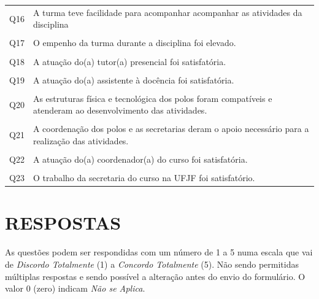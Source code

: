 \documentclass[a4paper,10pt]{article}
\begin{document}
{\begin{center}
\begin{tabularx}{\linewidth}{c|X}
Q16&A turma teve facilidade para acompanhar acompanhar as atividades da disciplina\\\\
Q17&O empenho da turma durante a disciplina foi elevado.\\\\
Q18&A atuação do(a) tutor(a) presencial foi satisfatória.\\\\
Q19&A atuação do(a) assistente à docência foi satisfatória.\\\\
Q20&As estruturas física e tecnológica dos polos foram compatíveis e atenderam ao desenvolvimento das atividades.\\\\
Q21&A coordenação dos polos e as secretarias deram o apoio necessário para a realização das atividades.\\\\
Q22&A atuação do(a) coordenador(a) do curso foi satisfatória.\\\\
Q23&O trabalho da secretaria do curso na UFJF foi satisfatório.
\end{tabularx}
\end{center}
}
\section{RESPOSTAS}
As questões podem ser respondidas com um número de 1 a 5 numa escala que vai de {\it Discordo Totalmente} (1) a {\it Concordo Totalmente} (5). Não sendo permitidas múltiplas respostas e sendo possível a alteração antes do envio do formulário. O valor 0 (zero) indicam {\it Não se Aplica}.
\end{document}
